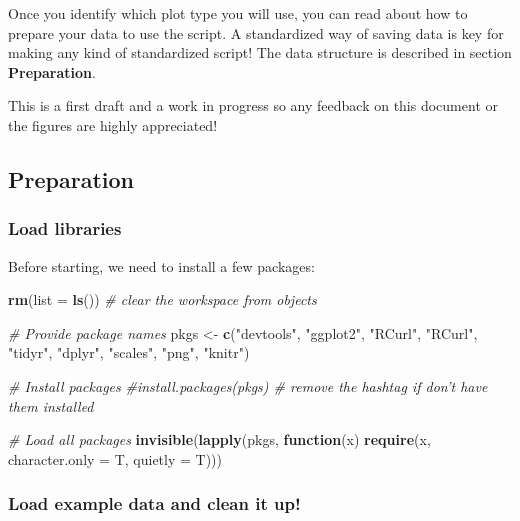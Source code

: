 \documentclass[]{article}
\newenvironment{Shaded}{\begin{snugshade}}{\end{snugshade}}
\newcommand{\KeywordTok}[1]{\textcolor[rgb]{0.13,0.29,0.53}{\textbf{#1}}}
\newcommand{\DataTypeTok}[1]{\textcolor[rgb]{0.13,0.29,0.53}{#1}}
\newcommand{\StringTok}[1]{\textcolor[rgb]{0.31,0.60,0.02}{#1}}
\newcommand{\CommentTok}[1]{\textcolor[rgb]{0.56,0.35,0.01}{\textit{#1}}}
\newcommand{\ControlFlowTok}[1]{\textcolor[rgb]{0.13,0.29,0.53}{\textbf{#1}}}
\newcommand{\NormalTok}[1]{#1}
\begin{document}
Once you identify which plot type you will use, you can read about how
to prepare your data to use the script. A standardized way of saving
data is key for making any kind of standardized script! The data
structure is described in section \textbf{Preparation}.

This is a first draft and a work in progress so any feedback on this
document or the figures are highly appreciated!

\subsection{Preparation}\label{preparation}

\subsubsection{Load libraries}\label{load-libraries}

Before starting, we need to install a few packages:

\begin{Shaded}
\begin{Highlighting}[]
\KeywordTok{rm}\NormalTok{(}\DataTypeTok{list =} \KeywordTok{ls}\NormalTok{()) }\CommentTok{# clear the workspace from objects}

\CommentTok{# Provide package names}
\NormalTok{pkgs <-}\StringTok{ }\KeywordTok{c}\NormalTok{(}\StringTok{"devtools"}\NormalTok{, }\StringTok{"ggplot2"}\NormalTok{, }\StringTok{"RCurl"}\NormalTok{, }\StringTok{"RCurl"}\NormalTok{, }\StringTok{"tidyr"}\NormalTok{, }\StringTok{"dplyr"}\NormalTok{, }\StringTok{"scales"}\NormalTok{, }\StringTok{"png"}\NormalTok{, }\StringTok{"knitr"}\NormalTok{)}

\CommentTok{# Install packages}
\CommentTok{#install.packages(pkgs) # remove the hashtag if don't have them installed}

\CommentTok{# Load all packages}
\KeywordTok{invisible}\NormalTok{(}\KeywordTok{lapply}\NormalTok{(pkgs, }\ControlFlowTok{function}\NormalTok{(x) }\KeywordTok{require}\NormalTok{(x, }\DataTypeTok{character.only =}\NormalTok{ T, }\DataTypeTok{quietly =}\NormalTok{ T)))}
\end{Highlighting}
\end{Shaded}

\subsubsection{Load example data and clean it
up!}\label{load-example-data-and-clean-it-up}
\end{document}

